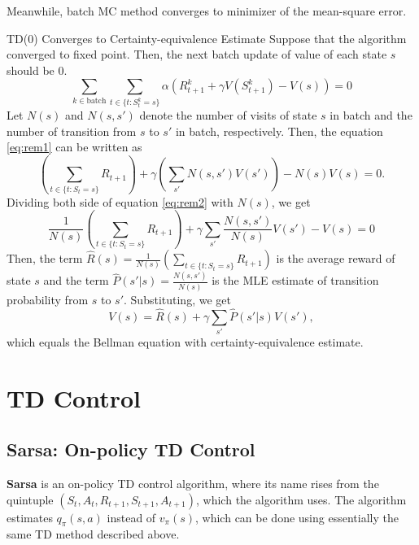 \documentclass[../../main.tex]{subfiles}
\begin{document}
        Meanwhile, batch MC method converges to minimizer of the mean-square error.
        
        \begin{rem}{TD(0) Converges to Certainty-equivalence Estimate}
            Suppose that the algorithm converged to fixed point. Then, the next batch update of value of each state $s$ should be 0.
            \begin{equation}
                \sum_{k \in \text{batch}}\sum_{t \in \{t : S_t^k=s\}}\alpha(R_{t+1}^k + \gamma V(S_{t+1}^k) - V(s))=0 \label{eq:rem1}
            \end{equation}
            Let $N(s)$ and $N(s,s')$ denote the number of visits of state $s$ in batch and the number of transition from $s$ to $s'$ in batch, respectively.
            Then, the equation \ref{eq:rem1} can be written as
            \begin{equation}
                \left(\sum_{t \in \{t : S_t = s\}} R_{t+1}\right) + \gamma \left( \sum_{s'}N(s,s')V(s') \right) - N(s)V(s) = 0. \label{eq:rem2}
            \end{equation}
            Dividing both side of equation \ref{eq:rem2} with $N(s)$, we get
            \begin{equation}
                \frac{1}{N(s)}\left( \sum_{t \in \{t : S_t = s\}} R_{t+1}\right) + \gamma \sum_{s'}\frac{N(s,s')}{N(s)}V(s') - V(s) = 0
            \end{equation}
            Then, the term $\hat{R}(s) = \frac{1}{N(s)}\left( \sum_{t \in \{t : S_t = s\}} R_{t+1}\right)$ is the average reward of state $s$ and
            the term $\hat{P}(s'|s) = \frac{N(s,s')}{N(s)}$ is the MLE estimate of transition probability from $s$ to $s'$.
            Substituting, we get
            \begin{equation}
                V(s) = \hat{R}(s) + \gamma \sum_{s'}\hat{P}(s'|s)V(s'),
            \end{equation}
            which equals the Bellman equation with certainty-equivalence estimate.
        \end{rem}

\section{TD Control}
    \subsection{Sarsa: On-policy TD Control}
        \textbf{Sarsa} is an on-policy TD control algorithm, where its name rises from the quintuple $(S_t,A_t,R_{t+1},S_{t+1},A_{t+1})$,
        which the algorithm uses. The algorithm estimates $q_\pi(s,a)$ instead of $v_\pi(s)$, which can be done using essentially the same TD method
        described above.
\end{document}
